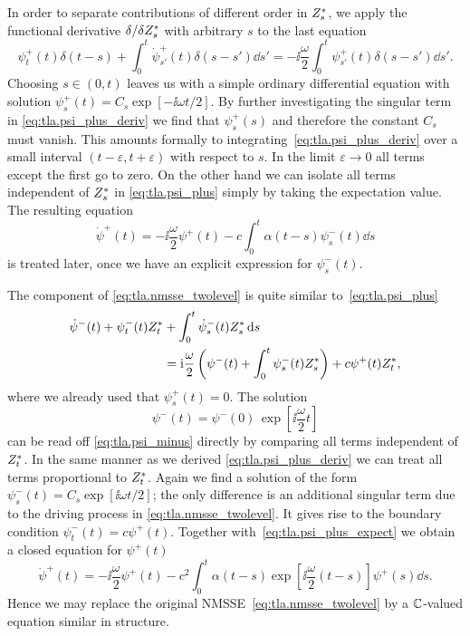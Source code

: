In order to separate contributions of different order in ${Z}^*_s$, we apply the functional derivative $\delta/\delta{Z}^*_s$ with arbitrary $s$ to the last equation
\begin{equation}
  \psi^+_t(t) \delta(t - s) + \int_0^t \dot\psi^+_{s'}(t) \delta(s - s') \dd s' = -\ii \frac{\omega}{2} \int_0^t \psi^+_{s'}(t) \delta(s - s') \dd s'.
  \label{eq:tla.psi_plus_deriv}
\end{equation}
Choosing $s \in (0, t)$ leaves us with a simple ordinary differential equation with solution $\psi^+_s(t) = C_s \exp[- \ii \omega t / 2]$.
By further investigating the singular term in \autoref{eq:tla.psi_plus_deriv} we find that $\psi^+_s(s)$ and therefore the constant $C_s$ must vanish.
This amounts formally to integrating~\ref{eq:tla.psi_plus_deriv} over a small interval $(t-\varepsilon, t+\varepsilon)$ with respect to $s$.
In the limit $\varepsilon \to 0$ all terms except the first go to zero.
On the other hand we can isolate all terms independent of ${Z}^*_s$ in \autoref{eq:tla.psi_plus} simply by taking the expectation value.
The resulting equation
\begin{equation}
  \dot\psi^+(t) = -\ii \frac{\omega}{2} \psi^+(t)  - c \int_0^t \alpha(t - s) \psi^-_s(t) \dd s
  \label{eq:psi_plus_expect}
\end{equation}
is treated later, once we have an explicit expression for $\psi^-_s(t)$.

The \quotes{-} component of \autoref{eq:tla.nmsse_twolevel} is quite similar to~\ref{eq:tla.psi_plus}
\begin{align}
  \dot\psi^-(t) + \psi^-_t(t){Z}^*_t &+ \int_0^t \dot\psi^-_s(t){Z}^*_s \, \mathrm{d} s \nonumber \\
  &= \mathrm{i} \frac{\omega}{2} \left( \psi^-(t) + \int_0^t \psi^-_s(t){Z}^*_s \right) + c \psi^+(t){Z}^*_t,
  \label{eq:tla.psi_minus}
\end{align}
where we already used that $\psi^+_s(t) = 0$.
The solution
\begin{equation}
  \psi^-(t) = \psi^-(0) \, \exp[\ii \frac{\omega}{2} t]
\end{equation}
can be read off \autoref{eq:tla.psi_minus} directly by comparing all terms independent of ${Z}^*_t$.
In the same manner as we derived \autoref{eq:tla.psi_plus_deriv} we can treat all terms proportional to ${Z}^*_t$.
Again we find a solution of the form $\psi^-_s(t) = C_s \exp[\ii\omega t / 2]$; the only difference is an additional singular term due to the driving process in \autoref{eq:tla.nmsse_twolevel}.
It gives rise to the boundary condition $\psi^-_t(t) = c \psi^+(t)$.
Together with~\ref{eq:tla.psi_plus_expect} we obtain a closed equation for $\psi^+(t)$
\begin{equation}
  \dot\psi^+(t) = -\ii \frac{\omega}{2} \psi^+(t) - c^2 \int_0^t \alpha(t - s) \exp[\ii \frac{\omega}{2} (t - s)] \psi^+(s) \dd s.
  \label{eq:tla.psi_plus_eq}
\end{equation}
Hence we may replace the original NMSSE~\ref{eq:tla.nmsse_twolevel} by a $\mathbb{C}$-valued equation similar in structure.


